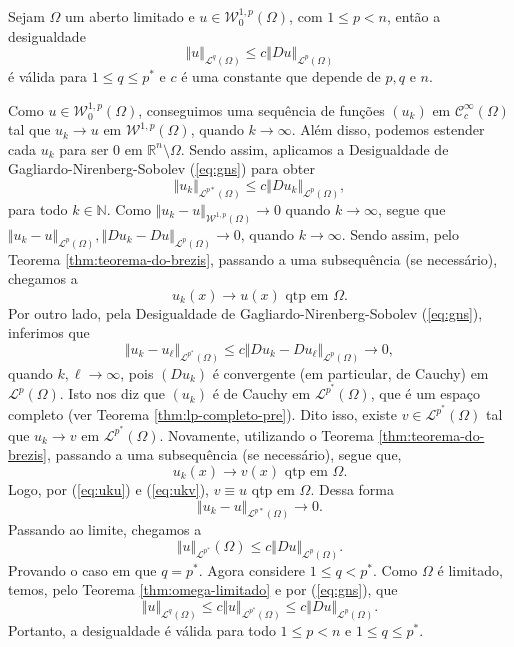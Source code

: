 \documentclass[a4paper, 11pt]{book}
\theoremstyle{definition}
\newcommand{\bN}{\mathbb{N}}
\newcommand{\bR}{\mathbb{R}}
\newcommand{\cC}{\mathcal{C}}
\newcommand{\cL}{\mathcal{L}}
\newcommand{\cW}{\mathcal{W}}
\begin{document}
\begin{tbox}
    Sejam $\Omega$ um aberto limitado e $u \in \cW^{1,p}_0(\Omega)$, com $1 \leqslant p < n$, então a desigualdade
    \[
        \Vert u \Vert_{\cL^q(\Omega)} \leqslant c \Vert Du \Vert_{\cL^p(\Omega)}
    \]
    é válida para $1 \leqslant q \leqslant p^*$ e $c$ é uma constante que depende de $p, q$ e $n$.
\end{tbox}
\begin{prf}
    Como $u \in \cW^{1,p}_0(\Omega)$, conseguimos uma sequência de funções $(u_k)$ em $\cC^{\infty}_c(\Omega)$ tal que $u_k \to u$ em $\cW^{1,p}(\Omega)$, quando $k \to \infty$.
    Além disso, podemos estender cada $u_k$ para ser $0$ em $\bR^n \setminus \Omega$.
    Sendo assim, aplicamos a Desigualdade de Gagliardo-Nirenberg-Sobolev (\ref{eq:gns}) para obter
    \[
        \Vert u_k \Vert_{\cL^{p*}(\Omega)} \leqslant c \Vert Du_k \Vert_{\cL^p(\Omega)},
    \]
    para todo $k \in \bN$.
    Como $\Vert u_k - u \Vert_{\cW^{1,p}(\Omega)} \to 0$ quando $k \to \infty$, segue que $\Vert u_k - u \Vert_{\cL^p(\Omega)}, \Vert Du_k - Du \Vert_{\cL^p(\Omega)} \to 0$, quando $k \to \infty$.
    Sendo assim, pelo Teorema \ref{thm:teorema-do-brezis}, passando a uma subsequência (se necessário), chegamos a
    \begin{equation} \label{eq:uku}
        u_k(x) \to u(x) \text{ qtp em } \Omega.
    \end{equation}
    Por outro lado, pela Desigualdade de Gagliardo-Nirenberg-Sobolev (\ref{eq:gns}), inferimos que
    \[
        \Vert u_k - u_\ell \Vert_{\cL^{p^*}(\Omega)} \leqslant c \Vert Du_k - Du_\ell \Vert_{\cL^p(\Omega)} \to 0,
    \]
    quando $k,\ell \to \infty$, pois $(Du_k)$ é convergente (em particular, de Cauchy) em $\cL^p(\Omega)$. Isto nos diz que $(u_k)$ é de Cauchy em $\cL^{p^*}(\Omega)$, que é um espaço completo (ver Teorema \ref{thm:lp-completo-pre}). Dito isso, existe $v \in \cL^{p^*}(\Omega)$ tal que $u_k \to v$ em $\cL^{p^*}(\Omega)$.
    Novamente, utilizando o Teorema \ref{thm:teorema-do-brezis}, passando a uma subsequência (se necessário), segue que,
    \begin{equation} \label{eq:ukv}
        u_k(x) \to v(x) \text{ qtp em } \Omega.
    \end{equation}
    Logo, por (\ref{eq:uku}) e (\ref{eq:ukv}), $v \equiv u$ qtp em $\Omega$.
    Dessa forma
    \[
        \Vert u_k - u \Vert_{\cL^{p*}(\Omega)} \to 0.
    \]
    Passando ao limite, chegamos a
    \[
        \Vert u \Vert_{\cL^{p^*}}(\Omega) \leqslant c \Vert Du \Vert_{\cL^p(\Omega)}.
    \]
    Provando o caso em que $q = p^*$. Agora considere $1 \leqslant q < p^*$.
    Como $\Omega$ é limitado, temos, pelo Teorema \ref{thm:omega-limitado} e por (\ref{eq:gns}), que
    \[
        \Vert u \Vert_{\cL^q(\Omega)} \leqslant c\Vert u \Vert_{\cL^{p^*}(\Omega)} \leqslant c \Vert Du \Vert_{\cL^p(\Omega)}.
    \]
    Portanto, a desigualdade é válida para todo $1 \leqslant p < n$ e $1 \leqslant q \leqslant p^*$.
\end{prf}
\end{document}
